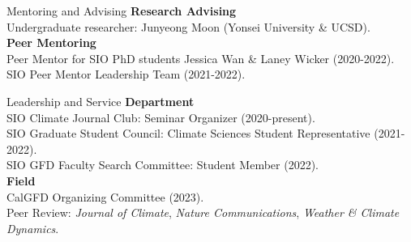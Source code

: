 \documentclass{resume} %
\begin{document}

\begin{rSection}{Mentoring and Advising}
\textbf{Research Advising}\\
\hspace*{1cm}Undergraduate researcher: Junyeong Moon (Yonsei University \& UCSD). \\ 
\textbf{Peer Mentoring} \\ 
\hspace*{1cm} Peer Mentor for SIO PhD students Jessica Wan \& Laney Wicker (2020-2022). \\ 
\hspace*{1cm} SIO Peer Mentor Leadership Team (2021-2022). \\

\end{rSection}


\begin{rSection}{Leadership and Service}
\textbf{Department} \\ 
\hspace*{1cm}SIO Climate Journal Club: Seminar Organizer (2020-present). \\ 
\hspace*{1cm}SIO Graduate Student Council: Climate Sciences Student Representative (2021-2022). \\ 
\hspace*{1cm}SIO GFD Faculty Search Committee: Student Member (2022). \\ 
\textbf{Field}\\
\hspace*{1cm}CalGFD Organizing Committee (2023). \\ 
\hspace*{1cm}Peer Review: \textit{Journal of Climate}, \textit{Nature Communications}, \textit{Weather \& Climate Dynamics}. \\

\end{rSection}

\end{document}
